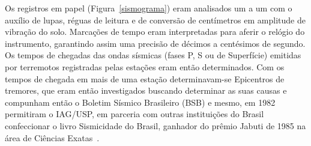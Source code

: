 \documentclass{article}
\begin{document}
Os registros em papel (Figura~\ref{sismograma}) eram analisados um a um com o auxílio
de lupas, réguas de leitura e de conversão de centímetros em amplitude
de vibração do solo. Marcações de tempo eram interpretadas para aferir
o relógio do instrumento, garantindo assim uma precisão de décimos a
centésimos de segundo. Os tempos de chegadas das ondas sísmicas (fases
P, S ou de Superfície) emitidas por terremotos registradas pelas
estações eram então determinados. Com os tempos de chegada em mais de
uma estação determinavam-se Epicentros de tremores, que eram então
investigados buscando determinar as suas causas e compunham então o
Boletim Sísmico Brasileiro (BSB) e mesmo, em 1982 permitiram o
IAG/USP, em parceria com outras instituições do Brasil confeccionar o
livro Sismicidade do Brasil, ganhador do prêmio Jabuti de 1985 na área
de Ciências Exatas~\cite{sismicidade-brasil}.
\end{document}
